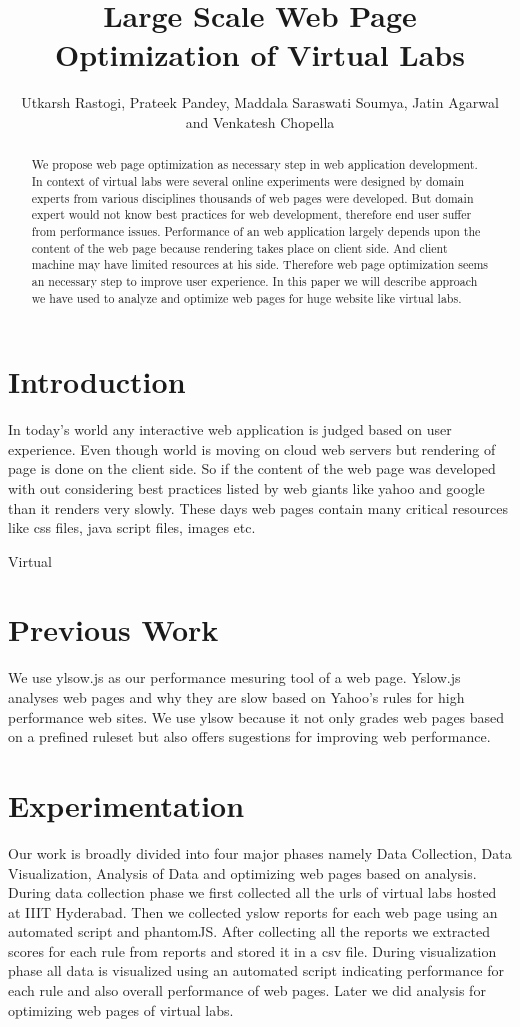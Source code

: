\documentclass[a4paper,10pt]{IEEEtran}
\title{Large Scale Web Page Optimization of Virtual Labs}
\author{Utkarsh Rastogi, Prateek Pandey, Maddala Saraswati Soumya, Jatin Agarwal and Venkatesh Chopella}
\begin{document}
\maketitle

\begin{abstract}
We propose web page optimization as necessary step in web application development. In context of virtual labs were several online
experiments were designed by domain experts from various disciplines thousands of web pages were developed. But domain expert 
would not know best practices for web development, therefore end user suffer from  performance issues. Performance of an web
application largely depends upon the content of the web page because rendering takes place on client side. And client machine may
have limited resources at his side. Therefore web page optimization seems an necessary step to improve user experience. In this
paper we will describe approach we have used to analyze and optimize web pages for huge website like virtual labs. 
\end{abstract}

\section{Introduction}
In today's world any interactive web application is judged based on user experience. Even though world is moving on
cloud web servers but rendering of page is done on the client side. So if the content of the web page was developed with out
considering best practices listed by web giants like yahoo and google than it renders very slowly. These days web pages 
contain many critical resources like css files, java script files, images etc. 

Virtual 

\section{Previous Work}
We use ylsow.js as our performance mesuring tool of a web page. Yslow.js analyses web pages and why they are slow based on Yahoo's
rules for high performance web sites. We use ylsow because it not only grades web pages based on a prefined ruleset but also offers
sugestions for improving web performance.
\section{Experimentation}
Our work is broadly divided into four major phases namely Data Collection, Data Visualization, Analysis of Data and
optimizing web pages based on analysis. During data collection phase we first collected all the urls of virtual labs hosted at IIIT Hyderabad.
Then we collected yslow reports for each web page using an automated script and phantomJS. After collecting all the reports we extracted scores
for each rule from reports and stored it in a csv file. During visualization phase all data is visualized using an automated script indicating
performance for each rule and also overall performance of web pages. Later we did analysis for optimizing web pages of virtual labs. 
\end{document}
